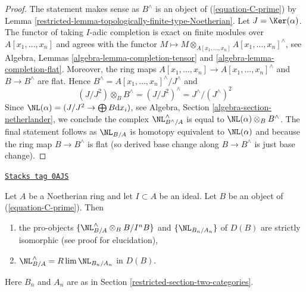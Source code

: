 \begin{proof}

The statement makes sense as $B^\wedge$ is an object of
(\ref{equation-C-prime}) by
Lemma \ref{restricted-lemma-topologically-finite-type-Noetherian}.
Let $J = \Ker(\alpha)$. The functor of taking
$I$-adic completion is exact on finite modules over
$A[x_1, \ldots, x_n]$ and agrees with the functor
$M \mapsto M \otimes_{A[x_1, \ldots, x_n]} A[x_1, \ldots, x_n]^\wedge$, see
Algebra, Lemmas \ref{algebra-lemma-completion-tensor} and
\ref{algebra-lemma-completion-flat}. Moreover, the ring maps
$A[x_1, \ldots, x_n] \to A[x_1, \ldots, x_n]^\wedge$
and $B \to B^\wedge$ are flat. Hence
$B^\wedge = A[x_1, \ldots, x_n]^\wedge / J^\wedge$ and
$$
(J/J^2) \otimes_B B^\wedge = (J/J^2)^\wedge = J^\wedge/(J^\wedge)^2
$$
Since $\NL(\alpha) = (J/J^2 \to \bigoplus B\text{d}x_i)$,
see Algebra, Section \ref{algebra-section-netherlander},
we conclude the complex $\NL_{B^\wedge/A}^\wedge$ is equal
to $\NL(\alpha) \otimes_B B^\wedge$. The final statement
follows as $\NL_{B/A}$ is homotopy equivalent to $\NL(\alpha)$
and because the ring map $B \to B^\wedge$ is flat (so derived
base change along $B \to B^\wedge$ is just base change).
\end{proof}

\begin{lemma}[NL is limit]
\label{restricted-lemma-NL-is-limit}
\href{https://stacks.math.columbia.edu/tag/0AJS}{\texttt{Stacks tag 0AJS}}

Let $A$ be a Noetherian ring and let $I \subset A$ be an ideal.
Let $B$ be an object of (\ref{equation-C-prime}). Then
\begin{enumerate}
\item the pro-objects
$\{\NL_{B/A}^\wedge \otimes_B B/I^nB\}$ and $\{\NL_{B_n/A_n}\}$
of $D(B)$ are strictly isomorphic (see proof for elucidation),
\item $\NL_{B/A}^\wedge = R\lim \NL_{B_n/A_n}$ in $D(B)$.
\end{enumerate}
Here $B_n$ and $A_n$ are as in Section \ref{restricted-section-two-categories}.
\end{lemma}

